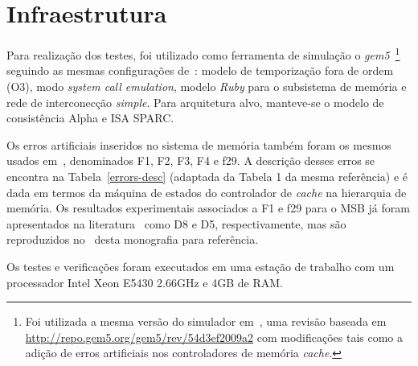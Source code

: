 \section{Infraestrutura}

\newcommand{\aboutcheckerrevision}{\footnote{%
    Foi utilizada a mesma versão do simulador em~\cite{Andrade:2017}, uma
    revisão baseada em \url{http://repo.gem5.org/gem5/rev/54d3ef2009a2} com
    modificações tais como a adição de erros artificiais nos controladores de
    memória \textit{cache}.
}}

Para realização dos testes, foi utilizado como ferramenta de simulação o
\textit{gem5}~\cite{Binkert:2011:GS:2024716.2024718}\aboutcheckerrevision%
seguindo as mesmas configurações de~\cite{Andrade:2017}: modelo de temporização
fora de ordem (O3), modo \textit{system call emulation}, modelo \textit{Ruby}
para o subsistema de memória e rede de interconecção \textit{simple}. Para
arquitetura alvo, manteve-se o modelo de consistência Alpha e ISA SPARC\@.

Os erros artificiais inseridos no sistema de memória também foram os mesmos
usados em~\cite{Andrade:2017}, denominados F1, F2, F3, F4 e f29. A descrição
desses erros se encontra na Tabela~\ref{errors-desc} (adaptada da Tabela 1 da
mesma referência) e é dada em termos da máquina de estados do controlador de
\textit{cache} na hierarquia de memória. Os resultados experimentais associados
a F1 e f29 para o MSB já foram apresentados na literatura~\cite{Andrade:2019}
como D8 e D5, respectivamente, mas são reproduzidos no~ desta
monografia para referência.

Os testes e verificações foram executados em uma estação de trabalho com um
processador Intel Xeon E5430 2.66GHz e 4GB de RAM\@.


